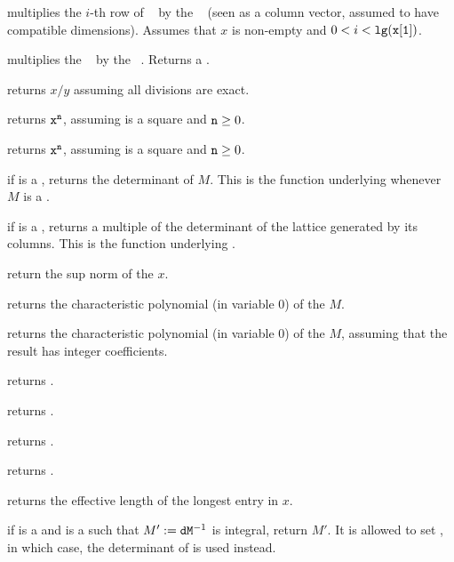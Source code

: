 


 multiplies the $i$-th row
of ~ by the ~ (seen as a column vector, assumed
to have compatible dimensions). Assumes that $x$ is non-empty and
$0 < i < {\tt lg(x[1])}$.

 multiplies the ~
by the ~. Returns a .

 returns $x/y$ assuming all divisions
are exact.

 returns ${\tt x}^{\tt n}$, assuming 
is a square  and ${\tt n}\geq 0$.

 returns ${\tt x}^{\tt n}$, assuming 
is a square  and ${\tt n}\geq 0$.

 if  is a , returns the determinant of
$M$. This is the function underlying  whenever $M$ is a .

 if  is a , returns a multiple of
the determinant of the lattice generated by its columns. This is the function
underlying .

 return the sup norm of the  $x$.

 returns the characteristic polynomial (in
variable $0$) of the  $M$.

 returns the characteristic polynomial
(in variable $0$) of the  $M$, assuming that the result has integer
coefficients.

 returns .

 returns .

 returns .

 returns .

 returns the effective length of the longest
entry in $x$.

 if  is a  and 
is a  such that $M' := {\tt d}{\tt M}^{-1}$ is integral,
return $M'$. It is allowed to set , in which case, the
determinant of  is used instead.

